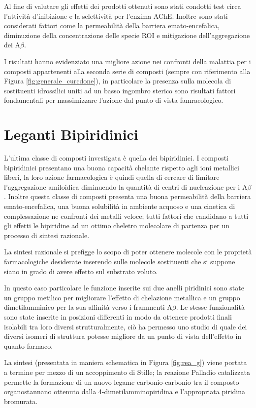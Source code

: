 \documentclass[a4paper, 11pt]{article}
\begin{document}
Al fine di valutare gli effetti dei prodotti ottenuti sono stati condotti test circa l'attività d'inibizione e la selettività per l'enzima AChE. Inoltre sono stati considerati fattori come la permeabilità della barriera emato-encefalica, diminuzione della concentrazione delle specie ROI e mitigazione dell'aggregazione dei A$\beta$.

I risultati hanno evidenziato una migliore azione nei confronti della malattia per i composti appartenenti alla seconda serie di composti (sempre con riferimento alla Figura \ref{fig:generale_curcdone}), in particolare la presenza sulla molecola di sostituenti idrossilici uniti ad un basso ingombro sterico sono risultati fattori fondamentali per massimizzare l'azione dal punto di vista famracologico. \cite{jun_yan_design_2017}

\section{Leganti Bipiridinici}
L'ultima classe di composti investigata è quella dei bipiridinici. I composti bipiridinici presentano una buona capacità chelante rispetto agli ioni metallici liberi, la loro azione farmacologica è quindi quella di cercare di limitare l'aggregazione amiloidica diminuendo la quantità di centri di nucleazione per i A$\beta$. Inoltre questa classe di composti presenta una buona permeabilità della barriera emato-encefalica, una buona solubilità in ambiente acquoso e una cinetica di complessazione ne confronti dei metalli veloce; tutti fattori che candidano a tutti gli effetti le bipiridine ad un ottimo cheletro molecolare di partenza per un processo di sintesi razionale.

La sintesi razionale si prefigge lo scopo di poter ottenere molecole con le proprietà farmacologiche desiderate inserendo sulle molecole sostituenti che si suppone siano in grado di avere effetto sul substrato voluto.

In questo caso particolare le funzione inserite sui due anelli piridinici sono state un gruppo metilico per migliorare l'effetto di chelazione metallica e un gruppo dimetilamminico per la sua affinità verso i frammenti A$\beta$. Le stesse funzionalità sono state inserite in posizioni differenti in modo da ottenere prodotti finali isolabili tra loro diversi strutturalmente, ciò ha permesso uno studio di quale dei diversi isomeri di struttura potesse migliore da un punto di vista dell'effetto in quanto farmaco.

La sintesi (presentata in maniera schematica in Figura \ref{fig:rea_g}) viene portata a termine per mezzo di un accoppimento di Stille; la reazione Palladio catalizzata permette la formazione di un nuovo legame carbonio-carbonio tra il composto organostannano ottenuto dalla 4-dimetilamminopiridina e l'appropriata piridina bromurata.
\end{document}
